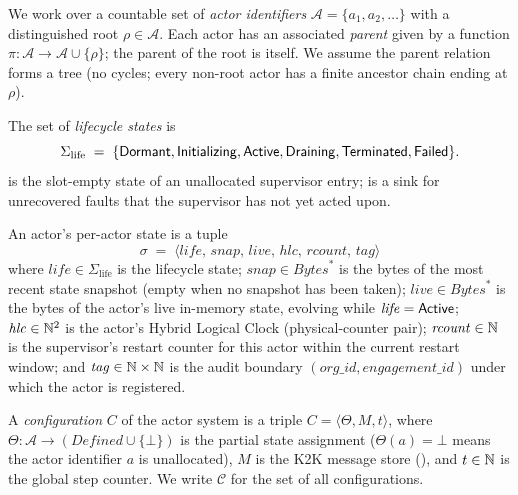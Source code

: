 We work over a countable set of \emph{actor identifiers}
\(\mathcal{A} = \{a_1, a_2, \ldots\}\) with a distinguished
root \(\rho \in \mathcal{A}\).  Each actor has an associated
\emph{parent} given by a function
\(\pi : \mathcal{A} \to \mathcal{A} \cup \{\rho\}\); the parent of
the root is itself.  We assume the parent relation forms a tree
(no cycles; every non-root actor has a finite ancestor chain
ending at \(\rho\)).

\begin{definition}
\label{def:lifecycle-state}
The set of \emph{lifecycle states} is
\[
\Sigma_{\mathrm{life}} \;=\;
  \{\mathsf{Dormant}{}, \mathsf{Initializing}{}, \mathsf{Active}{},
    \mathsf{Draining}{}, \mathsf{Terminated}{}, \mathsf{Failed}{}\}.
\]
\Dormant{} is the slot-empty state of an unallocated supervisor
entry; \Failed{} is a sink for unrecovered faults that the
supervisor has not yet acted upon.
\end{definition}

\begin{definition}
\label{def:actor-state}
An actor's per-actor state is a tuple
\[
  \sigma \;=\;
  \langle \mathit{life},\,
          \mathit{snap},\,
          \mathit{live},\,
          \mathit{hlc},\,
          \mathit{rcount},\,
          \mathit{tag} \rangle
\]
where
\(\mathit{life} \in \Sigma_{\mathrm{life}}\) is the lifecycle state;
\(\mathit{snap} \in \mathit{Bytes}^*\) is the bytes of the most
recent state snapshot (empty when no snapshot has been taken);
\(\mathit{live} \in \mathit{Bytes}^*\) is the bytes of the actor's
live in-memory state, evolving while \(\mathit{life} = \mathsf{Active}{}\);
\(\mathit{hlc} \in \mathbb{N}^2\) is the actor's Hybrid Logical Clock
(physical-counter pair);
\(\mathit{rcount} \in \mathbb{N}\) is the supervisor's restart counter for
this actor within the current restart window; and
\(\mathit{tag} \in \mathbb{N} \times \mathbb{N}\) is the audit boundary
\((\mathit{org\_id}, \mathit{engagement\_id})\) under which the
actor is registered.
\end{definition}

\begin{definition}[Configuration]
\label{def:configuration}
A \emph{configuration} \(C\) of the actor system is a triple
\(C = \langle \Theta, M, t \rangle\), where
\(\Theta : \mathcal{A} \to (\mathit{Defined} \cup \{\bot\})\) is
the partial state assignment
(\(\Theta(a) = \bot\) means the actor identifier \(a\) is
unallocated), \(M\) is the K2K message store
(), and
\(t \in \mathbb{N}\) is the global step counter.
We write \(\mathcal{C}\) for the set of all configurations.
\end{definition}

